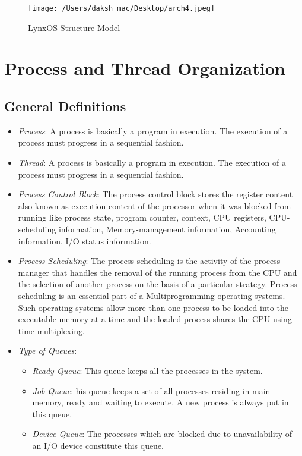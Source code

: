 \documentclass[12pt]{article}
\begin{document}
\begin{figure}[H]
	\centering
	\texttt{[image: /Users/daksh\_mac/Desktop/arch4.jpeg]}
	\caption[About arch]{LynxOS Structure Model}
	\label{fig:arch1}	
\end{figure}
\cleardoublepage

\section{Process and Thread Organization}\label{sec:procThread}

\subsection{General Definitions}

\begin{itemize}

	\item \emph{Process}: A process is basically a program in execution. The execution of a process must progress in a sequential fashion.
	
	\item \emph{Thread}: A process is basically a program in execution. The execution of a process must progress in a sequential fashion.
	
	\item \emph{Process Control Block}:  The process control block stores the register content also known as execution content of the processor when it was blocked from running like process state, program counter, context, CPU registers, CPU-scheduling information,  Memory-management information, Accounting information,  I/O status information. 
	
	\item \emph{Process Scheduling}: The process scheduling is the activity of the process manager that handles the removal of the running process from the CPU and the selection of another process on the basis of a particular strategy.
Process scheduling is an essential part of a Multiprogramming operating systems. Such operating systems allow more than one process to be loaded into the executable memory at a time and the loaded process shares the CPU using time multiplexing.

       \item \emph{Type of Queues}:
       		\begin{itemize}
			\item \emph{Ready Queue}: This queue keeps all the processes in the system.
			\item \emph{Job Queue}: his queue keeps a set of all processes residing in main memory, ready and waiting to execute. A new process is always put in this queue.
			\item \emph{Device Queue}: The processes which are blocked due to unavailability of an I/O device constitute this queue.
		\end{itemize}
 	
\end{itemize}
\end{document}

